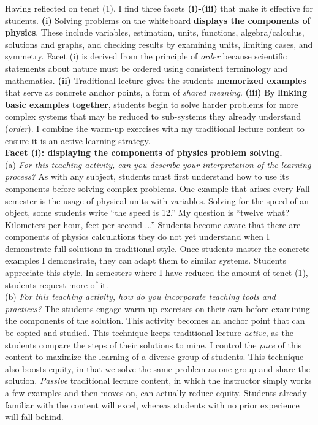 \documentclass[../../../main.tex]{subfiles}
\begin{document}
Having reflected on tenet (1), I find three facets \textbf{(i)-(iii)} that make it effective for students. \textbf{(i)} Solving problems on the whiteboard \textbf{displays the components of physics}.  These include variables, estimation, units, functions, algebra/calculus, solutions and graphs, and checking results by examining units, limiting cases, and symmetry.  Facet (i) is derived from the principle of \textit{order} because scientific statements about nature must be ordered using consistent terminology and mathematics. \textbf{(ii)} Traditional lecture gives the students \textbf{memorized examples} that serve as concrete anchor points, a form of \textit{shared meaning}.  \textbf{(iii)} By \textbf{linking basic examples together}, students begin to solve harder problems for more complex systems that may be reduced to sub-systems they already understand (\textit{order}).  I combine the warm-up exercises with my traditional lecture content to ensure it is an active learning strategy.
\\
\vspace{0.15cm}
\textbf{Facet (i): displaying the components of physics problem solving.}
\\
\vspace{0.15cm}
(a) \textit{For this teaching activity, can you describe your interpretation of the learning process?}  As with any subject, students must first understand how to use its components before solving complex problems.  One example that arises every Fall semester is the usage of physical units with variables.  Solving for the speed of an object, some students write ``the speed is 12.''  My question is ``twelve what? Kilometers per hour, feet per second ...'' Students become aware that there are components of physics calculations they do not yet understand when I demonstrate full solutions in traditional style.  Once students master the concrete examples I demonstrate, they can adapt them to similar systems.  Students appreciate this style.  In semesters where I have reduced the amount of tenet (1), students request more of it.
\\
\vspace{0.15cm}
(b) \textit{For this teaching activity, how do you incorporate teaching tools and practices?}  The students engage warm-up exercises on their own before examining the components of the solution.  This activity becomes an anchor point that can be copied and studied.  This technique keeps traditional lecture \textit{active}, as the students compare the steps of their solutions to mine.  I control the \textit{pace} of this content to maximize the learning of a diverse group of students.  This technique also boosts equity, in that we solve the same problem as one group and share the solution.  \textit{Passive} traditional lecture content, in which the instructor simply works a few examples and then moves on, can actually reduce equity.  Students already familiar with the content will excel, whereas students with no prior experience will fall behind.
\end{document}
